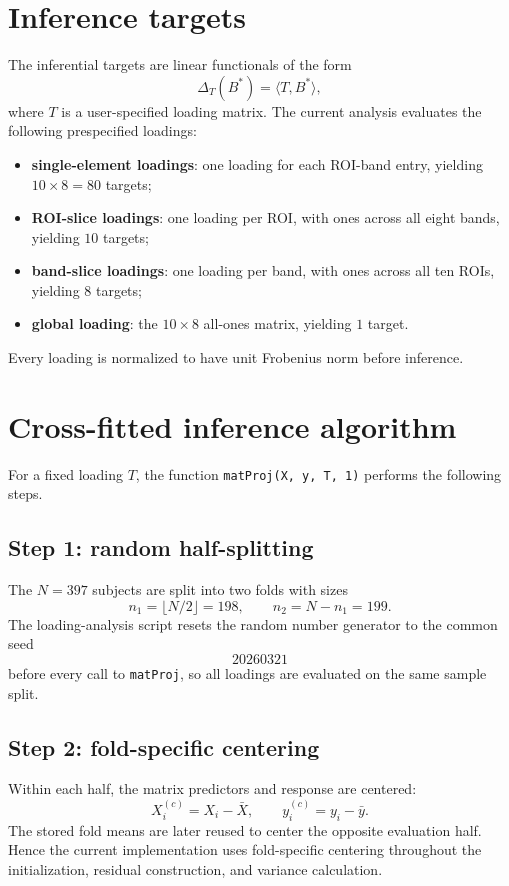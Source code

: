 \documentclass[11pt]{article}
\begin{document}
\section{Inference targets}
The inferential targets are linear functionals of the form
\[
\Delta_T(B^\ast)=\langle T,B^\ast\rangle,
\]
where \(T\) is a user-specified loading matrix. The current analysis evaluates the following prespecified loadings:
\begin{itemize}[leftmargin=2em]
    \item \textbf{single-element loadings}: one loading for each ROI-band entry, yielding \(10\times 8=80\) targets;
    \item \textbf{ROI-slice loadings}: one loading per ROI, with ones across all eight bands, yielding \(10\) targets;
    \item \textbf{band-slice loadings}: one loading per band, with ones across all ten ROIs, yielding \(8\) targets;
    \item \textbf{global loading}: the \(10\times 8\) all-ones matrix, yielding \(1\) target.
\end{itemize}
Every loading is normalized to have unit Frobenius norm before inference.

\section{Cross-fitted inference algorithm}
For a fixed loading \(T\), the function \texttt{matProj(X, y, T, 1)} performs the following steps.

\subsection*{Step 1: random half-splitting}
The \(N=397\) subjects are split into two folds with sizes
\[
n_1=\lfloor N/2\rfloor=198,\qquad n_2=N-n_1=199.
\]
The loading-analysis script resets the random number generator to the common seed
\[
20260321
\]
before every call to \texttt{matProj}, so all loadings are evaluated on the same sample split.

\subsection*{Step 2: fold-specific centering}
Within each half, the matrix predictors and response are centered:
\[
X_i^{(c)}=X_i-\bar X,\qquad y_i^{(c)}=y_i-\bar y.
\]
The stored fold means are later reused to center the opposite evaluation half. Hence the current implementation uses fold-specific centering throughout the initialization, residual construction, and variance calculation.
\end{document}
